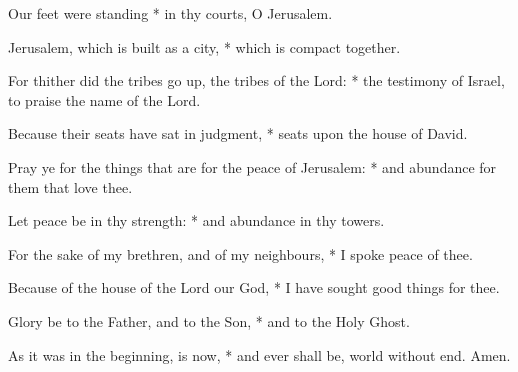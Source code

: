 ﻿\item Our feet were standing * in thy courts, O Jerusalem.
\item Jerusalem, which is built as a city, * which is compact together.
\item For thither did the tribes go up, the tribes of the Lord: * the testimony of Israel, to praise the name of the Lord.
\item Because their seats have sat in judgment, * seats upon the house of David.
\item Pray ye for the things that are for the peace of Jerusalem: * and abundance for them that love thee.
\item Let peace be in thy strength: * and abundance in thy towers.
\item For the sake of my brethren, and of my neighbours, * I spoke peace of thee.
\item Because of the house of the Lord our God, * I have sought good things for thee.
\item Glory be to the Father, and to the Son, * and to the Holy Ghost.
\item As it was in the beginning, is now, * and ever shall be, world without end. Amen.